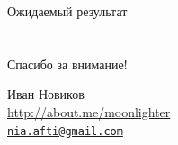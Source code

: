 \documentclass[usenames,dvipsnames,pdftex,unicode,hidelinks]{beamer}
\begin{document}
  \begin{frame}{Ожидаемый результат}

  \end{frame}


  \section{}

  \begin{frame}[plain]
    \begin{center}
      { \Huge Спасибо за внимание! }

      \vspace{1cm}

      Иван Новиков\\
      \url{http://about.me/moonlighter}\\
      \href{mailto:nia.afti@gmail.com}{\nolinkurl{nia.afti@gmail.com} }
      
    \end{center}
  \end{frame}
\end{document}
